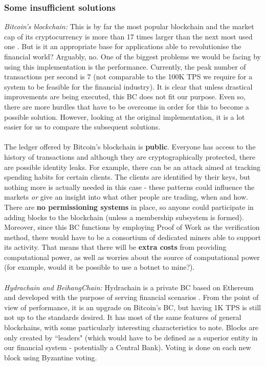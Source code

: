 \documentclass[12pt,twoside]{article}
\begin{document}
\subsubsection{Some insufficient solutions}
\label{sub:Insufficient}
\textit{Bitcoin's blockchain:} This is by far the most popular blockchain and the market cap of its cryptocurrency is more than 17 times larger than the next most used one \cite{BC:MC}. But is it an appropriate base for applications able to revolutionise the financial world? Arguably, no. One of the biggest problems we would be facing by using this implementation is the performance. Currently, the peak number of transactions per second is 7 (not comparable to the 100K TPS we require for a system to be feasible for the financial industry). It is clear that unless drastical improvements are being executed, this BC does not fit our purpose. Even so, there are more hurdles that have to be overcome in order for this to become a possible solution. However, looking at the original implementation, it is a lot easier for us to compare the subsequent solutions. 
\\ \\
The ledger offered by Bitcoin's blockchain is \textbf{public}. Everyone has access to the history of transactions and although they are cryptographically protected, there are possible identity leaks. For example, there can be an attack aimed at tracking spending habits for certain clients. The clients are identified by their keys, but nothing more is actually needed in this case - these patterns could influence the markets \textit{or} give an insight into what other people are trading, when and how. There are \textbf{no permissioning systems} in place, so anyone could participate in adding blocks to the blockchain (unless a membership subsystem is formed). Moreover, since this BC functions by employing Proof of Work as the verification method, there would have to be a consortium of dedicated miners able to support its activity. That means that there will be \textbf{extra costs} from providing computational power, as well as worries about the source of computational power (for example, would it be possible to use a botnet to mine?).
\\ \\
\textit{Hydrachain and BeihangChain:} Hydrachain is a private BC based on Ethereum and developed with the purpose of serving financial scenarios \cite{Chinese}. From the point of view of performance, it is an upgrade on Bitcoin's BC, but having 1K TPS is still not up to the standards desired. It has most of the same features of general blockchains, with some particularly interesting characteristics to note. Blocks are only created by ``leaders" (which would have to be defined as a superior entity in our financial system - potentially a Central Bank). Voting is done on each new block using Byzantine voting. 
\end{document}
